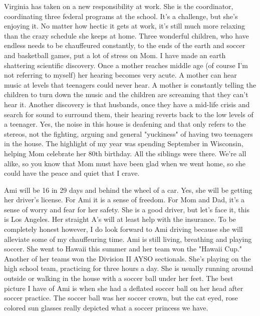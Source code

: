 Virginia has taken on a new responsibility at work. She is the coordinator, coordinating three federal programs at the school. It's a challenge,
but she's enjoying it. No matter how hectic it gets at work, it's still much more relaxing than the crazy schedule she keeps at home. Three
wonderful children, who have endless needs to be chauffeured constantly, to the ends of the earth and soccer and basketball games, put a lot of
stress on Mom. I have made an earth shattering scientific discovery. Once a mother reaches middle age (of course I'm not referring to myself)
her hearing becomes very acute. A mother can hear music at levels that teenagers could never hear. A mother is constantly telling the children
to turn down the music and the children are screaming that they can't hear it.   Another discovery is that husbands, once they have a mid-life
crisis and search for sound to surround them, their hearing reverts back to the low levels of a teenager. Yes, the noise in this house is
deafening and that only refers to the stereos, not the fighting, arguing and general "yuckiness" of having two teenagers in the house. The
highlight of my year was spending September in Wisconsin, helping Mom celebrate her 80th birthday. All the siblings were there. We're all alike,
so you know that Mom must have been glad when we went home, so she could have the peace and quiet that I crave.


Ami will be 16 in 29 days and behind the wheel of a car. Yes, she will be getting her driver's license. For Ami it is a sense of freedom. For
Mom and Dad, it's a sense of worry and fear for her safety. She is a good driver, but let's face it, this is Los Angeles. Her straight A's will
at least help with the insurance. To be completely honest however, I do look forward to Ami driving because she will alleviate some of my
chauffeuring time.  Ami is still living, breathing and playing soccer. She went to Hawaii this summer and her team won the "Hawaii Cup." Another
of her teams won the Division II AYSO sectionals. She's playing on the high school team, practicing for three hours a day. She is usually
running around outside or walking in the house with a soccer ball under her feet. The best picture I have of Ami is when she had a deflated
soccer ball on her head after soccer practice. The soccer ball was her soccer crown, but the cat eyed, rose colored sun glasses really depicted
what a soccer princess we have.


